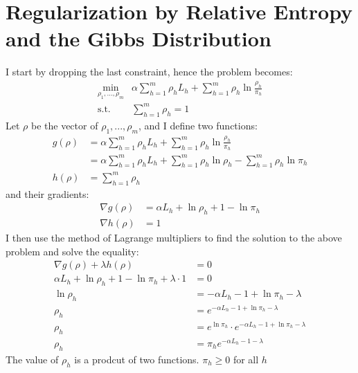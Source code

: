 \documentclass[a4paper]{article}
\begin{document}
\section{Regularization by Relative Entropy and the Gibbs Distribution}
\label{sec:2}
I start by dropping the last constraint, hence the problem becomes:
\[
\begin{array}
  {ll}{\min _{\rho_{1}, \ldots, \rho_{m}}} &
  {\alpha \sum_{h=1}^{m} \rho_{h} L_{h}+\sum_{h=1}^{m} \rho_{h} \ln \frac{\rho_{h}}{\pi_{h}}} \\
  {\text {s.t.}} & {\sum_{h=1}^{m} \rho_{h}=1}
\end{array}
\]
Let $\rho$ be the vector of $\rho_1,...,\rho_m$, and
I define two functions:
\begin{align*}
g(\rho) &= \alpha \sum_{h=1}^{m} \rho_{h} L_{h}+\sum_{h=1}^{m} \rho_{h} \ln \frac{\rho_{h}}{\pi_{h}}\\
&= \alpha \sum_{h=1}^{m} \rho_{h} L_{h}+\sum_{h=1}^{m} \rho_{h} \ln \rho_{h} - \sum_{h=1}^{m}\rho_{h} \ln \pi_{h}\\
h(\rho) &= \sum_{h=1}^{m} \rho_{h} 
\end{align*}
and their gradients:
\begin{align*}
  \nabla g(\rho) &= \alpha L_{h} + \ln \rho_{h} + 1 - \ln \pi_{h}\\
  \nabla h(\rho) &= 1
\end{align*}
I then use the method of Lagrange multipliers to find the solution to the above
problem and solve the equality:  
\begin{align*}
  \nabla g(\rho) + \lambda h(\rho) &= 0\\
  \alpha L_{h} + \ln \rho_{h} + 1 - \ln \pi_{h} + \lambda \cdot 1 &= 0\\
  \ln \rho_{h} &= -\alpha L_{h} - 1 + \ln \pi_{h} - \lambda\\
  \rho_{h} &= e^{-\alpha L_{h} - 1 + \ln \pi_{h} - \lambda}\\
  \rho_{h} &= e^{\ln \pi_h} \cdot e^{-\alpha L_{h} - 1 + \ln \pi_{h} - \lambda}\\
  \rho_{h} &= \pi_{h}e^{-\alpha L_{h} - 1 - \lambda} 
\end{align*}
The value of $\rho_h$ is a prodcut of two functions. $\pi_h \geq 0$ for all $h$
\end{document}
